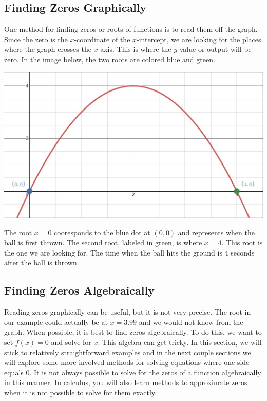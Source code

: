 \documentclass[nooutcomes]{ximera}
\begin{document}
\begin{example}
\begin{explanation}
\subsection{Finding Zeros Graphically}
One method for finding zeros or roots of functions is to read them off the graph. Since the zero is the $x$-coordinate of the $x$-intercept, we are looking for the places where the graph crosses the $x$-axis.  This is where the $y$-value or output will be zero.  In the image below, the two roots are colored blue and green.


\begin{image}
\includegraphics{Zeros-BouncingBall8}
\end{image}

The root $x=0$ cooresponds to the blue dot at $(0,0)$ and represents when the ball is first thrown.  The second root, labeled in green, is where $x=4$.  This root is the one we are looking for.  The time when the ball hits the ground is 4 seconds after the ball is thrown.

\subsection{Finding Zeros Algebraically}

Reading zeros graphically can be useful, but it is not very precise.  The root in our example could actually be at $x=3.99$ and we would not know from the graph.  When possible, it is best to find zeros algebraically.  To do this, we want to set $f(x)=0$ and solve for $x$.  This algebra can get tricky.  In this section, we will stick to relatively straightforward examples and in the next couple sections we will explore some more involved methods for solving equations where one side equals 0.  It is not always possible to solve for the zeros of a function algebraically in this manner.  In calculus, you will also learn methods to approximate zeros when it is not possible to solve for them exactly.


\end{explanation}
\end{example}
\end{document}
